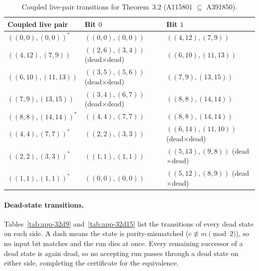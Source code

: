 \documentclass[11pt]{article}
\begin{document}
\begin{table}[ht]
\centering
\small
\begin{tabular}{lll}
\hline
Coupled live pair & Bit $0$ & Bit $1$ \\
\hline
$((0,0),(0,0))^*$ & $((0,0),(0,0))$ & $((4,12),(7,9))$ \\
$((4,12),(7,9))$ & $((2,6),(3,4))$ (dead$\times$dead) & $((6,10),(11,13))$ \\
$((6,10),(11,13))$ & $((3,5),(5,6))$ (dead$\times$dead) & $((7,9),(13,15))$ \\
$((7,9),(13,15))$ & $((3,4),(6,7))$ (dead$\times$dead) & $((8,8),(14,14))$ \\
$((8,8),(14,14))^*$ & $((4,4),(7,7))$ & $((8,8),(14,14))$ \\
$((4,4),(7,7))^*$ & $((2,2),(3,3))$ & $((6,14),(11,10))$ (dead$\times$dead) \\
$((2,2),(3,3))^*$ & $((1,1),(1,1))$ & $((5,13),(9,8))$ (dead$\times$dead) \\
$((1,1),(1,1))^*$ & $((0,0),(0,0))$ & $((5,12),(8,9))$ (dead$\times$dead) \\
\hline
\end{tabular}
\caption{Coupled live-pair transitions for Theorem~3.2 (A115801 $\subseteq$ A391850).}
\label{tab:app-32}
\end{table}

\paragraph{Dead-state transitions.}
Tables~\ref{tab:app-32d9} and~\ref{tab:app-32d15} list the transitions of every dead state on each side. A dash means the state is parity-mismatched ($c \not\equiv m \pmod{2}$), so no input bit matches and the run dies at once. Every remaining successor of a dead state is again dead, so no accepting run passes through a dead state on either side, completing the certificate for the equivalence.
\end{document}

